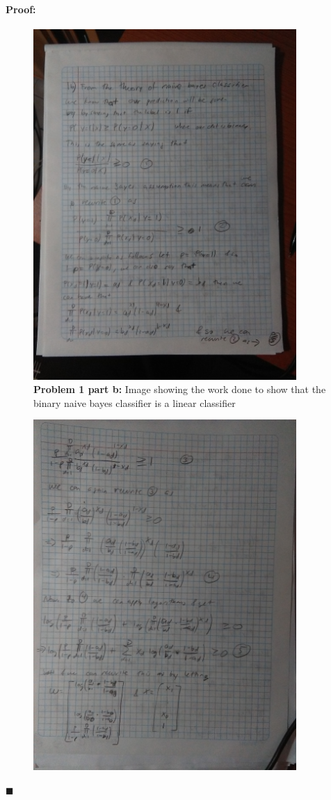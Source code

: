 \documentclass[12pt]{article}
\newenvironment{proof}{\paragraph{Proof: }}{\hfill$\blacksquare$}
\begin{document}
\begin{proof}
\begin{enumerate}
\begin{figure}[!htbp]
\centering
\includegraphics[width=10cm]{hw3_prob1b_1.jpg}
\caption{\textbf{Problem 1 part b:} Image showing the work done to show that the binary naive bayes classifier is a linear classifier}
\end{figure} 
\begin{figure}[!htbp]
\centering
\includegraphics[width=10cm]{hw3_prob1b_2.jpg}

\end{figure}
\end{enumerate}
\end{proof}
\end{document}
